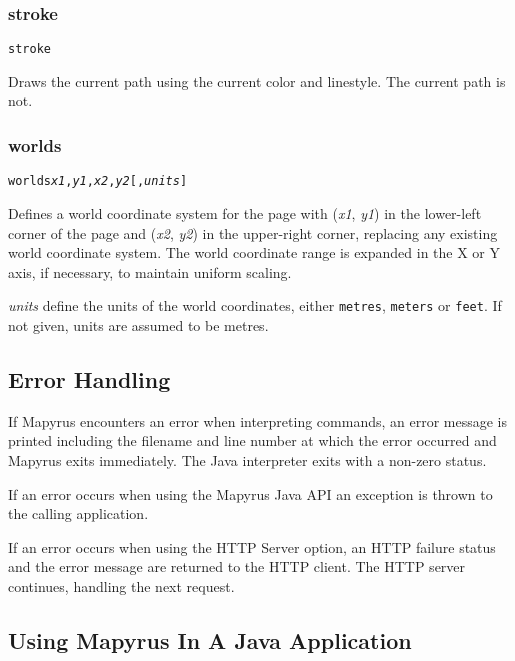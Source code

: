 \subsubsection{stroke}

\begin{alltt}
stroke
\end{alltt}

Draws the current path using the current color and linestyle.
The current path is not.

\subsubsection{worlds}

\begin{alltt}
worlds \textit{x1}, \textit{y1}, \textit{x2}, \textit{y2} [, \textit{units}]
\end{alltt}

Defines a world coordinate system for the page with
(\textit{x1}, \textit{y1}) in the lower-left corner of the page and
(\textit{x2}, \textit{y2}) in the upper-right corner, replacing any existing
world coordinate system.
The world coordinate range is expanded in the X or Y axis,
if necessary, to maintain uniform scaling.

\textit{units} define the units of the world coordinates,
either \texttt{metres}, \texttt{meters} or \texttt{feet}.
If not given, units are assumed to be metres.

\subsection{Error Handling}

If Mapyrus encounters an error when interpreting commands,
an error message is printed including the filename and line number
at which the error occurred and Mapyrus exits immediately.
The Java interpreter exits with a non-zero status.

If an error occurs when using the Mapyrus Java API an exception
is thrown to the calling application.

If an error occurs when using the HTTP Server
option, an HTTP failure status and the error message
are returned to the HTTP client.  The HTTP server continues,
handling the next request.

\subsection{Using Mapyrus In A Java Application}

